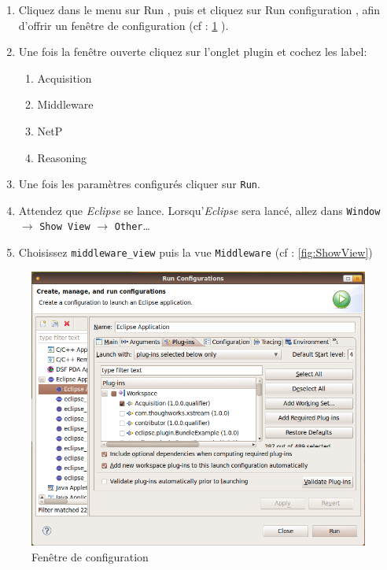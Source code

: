 \begin{enumerate}
 \item Cliquez dans le menu sur \og Run \fg, puis et cliquez sur \og Run configuration \fg, 
afin d'offrir un fenêtre de configuration (cf : \ref{fig:fenetreConfg} ).
  \item Une fois la fenêtre ouverte cliquez sur l'onglet plugin et cochez les label:
  \begin{enumerate}
      \item Acquisition
      \item Middleware
      \item NetP
      \item Reasoning
      \end{enumerate}
      \item Une fois les paramètres configurés cliquer sur \verb+Run+.
      \item Attendez que \emph{Eclipse} se lance. Lorsqu'\emph{Eclipse} sera lancé, allez dans \verb+Window+ $\rightarrow$ \verb+Show View+ $\rightarrow$ \verb+Other+\dots
      \item Choisissez \verb+middleware_view+ puis la vue \verb+Middleware+ (cf : \ref{fig:ShowView})
\end{enumerate}
  \begin{figure}[h]
	  \centering
	  \includegraphics[scale=0.40]{img/tuto}
	  \caption{Fenêtre de configuration}
	  \label{fig:fenetreConfg}
\end{figure}
